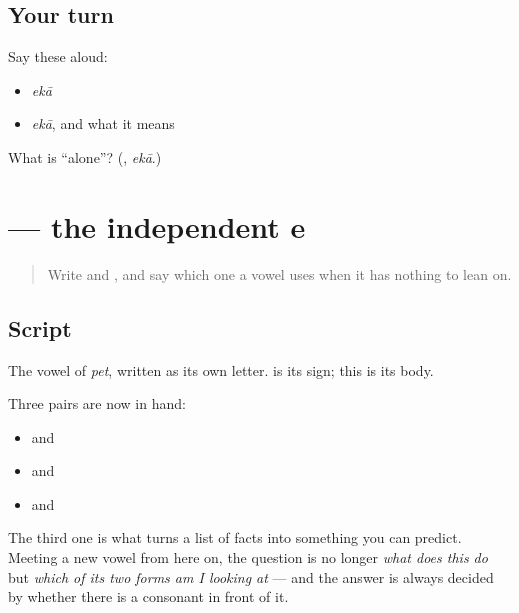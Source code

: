 \subsection*{Your turn}
Say these aloud:

\begin{itemize}
\raggedright
  \item \emph{ekā}
  \item \emph{ekā}, and what it means
\end{itemize}

\begin{tcolorbox}[breakable,colback=teal!4,colframe=teal!35!black,title={Before you move on}]
What is \textquotedblleft{}alone\textquotedblright{}? (\textbf{}, \emph{ekā}.)
\end{tcolorbox}
\section[\texorpdfstring{\bn{এ} (e)}{এ (e)}]{ — the independent e}

\label{lesson:BN-W04-e-indep}



\begin{quote}
Write \textbf{} and \textbf{}, and say which one a vowel uses when it has nothing to lean on.
\end{quote}

\subsection*{Script}

\begin{quote}
\end{quote}

The vowel of \emph{pet}, written as its own letter. \textbf{} is its sign; this is its body.

Three pairs are now in hand:

\begin{itemize}
\raggedright
  \item \textbf{} and \textbf{}
  \item \textbf{} and \textbf{}
  \item \textbf{} and \textbf{}
\end{itemize}

The third one is what turns a list of facts into something you can predict. Meeting a new vowel from here on, the question is no longer \emph{what does this do} but \emph{which of its two forms am I looking at} — and the answer is always decided by whether there is a consonant in front of it.

